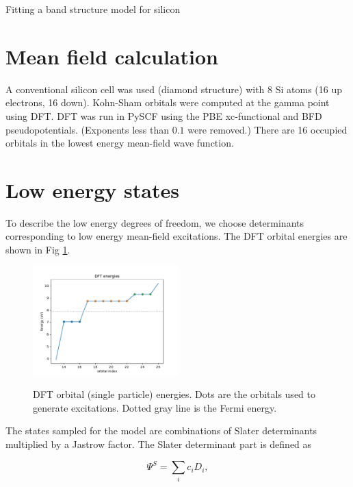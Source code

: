 



\begin{center}
{\Large Fitting a band structure model for silicon}
\end{center}

\section{Mean field calculation}

A conventional silicon cell was used (diamond structure) with 8 Si atoms (16 up electrons, 16 down).
Kohn-Sham orbitals were computed at the gamma point using DFT.
DFT was run in PySCF using the PBE xc-functional and BFD pseudopotentials.
(Exponents less than $0.1$ were removed.)
There are 16 occupied orbitals in the lowest energy mean-field wave function.


\section {Low energy states}

To describe the low energy degrees of freedom, we choose determinants corresponding to low energy mean-field excitations.
The DFT orbital energies are shown in Fig \ref{fig:dft_energies}.

\begin{figure}[h]
\begin{center}
\includegraphics[width=0.5\textwidth]{images/dft_energies_k888.pdf}
\label{fig:dft_energies}
\caption{DFT orbital (single particle) energies. 
Dots are the orbitals used to generate excitations. 
Dotted gray line is the Fermi energy.}
\end{center}
\end{figure}

The states sampled for the model are combinations of Slater determinants multiplied by a Jastrow factor.
The Slater determinant part is defined as

\begin{equation}
\Psi^S = \sum_i c_i D_i,
\end{equation}

